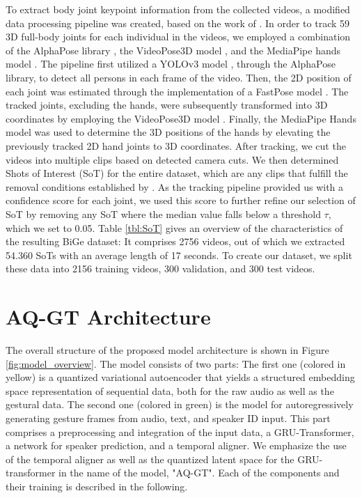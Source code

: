 \documentclass[sigconf]{acmart}
\begin{document}
To extract body joint keypoint information from the collected videos, a modified data processing pipeline was created, based on the work of \citet{yoonRobotsLearnSocial2019a}.
In order to track 59 3D full-body joints for each individual in the videos, we employed a combination of the AlphaPose library \cite{alphapose}, the VideoPose3D model \cite{pavllo20193d}, and the MediaPipe hands model \cite{zhang2020mediapipe}.
The pipeline first utilized a YOLOv3 model \cite{redmon2018yolov3}, through the AlphaPose library, to detect all persons in each frame of the video. Then, the 2D position of each joint was estimated through the implementation of a FastPose model \cite{zhang2019fast}. The tracked joints, excluding the hands, were subsequently transformed into 3D coordinates by employing the VideoPose3D model \cite{pavllo20193d}. Finally, the MediaPipe Hands model was used to determine the 3D positions of the hands by elevating the previously tracked 2D hand joints to 3D coordinates. 
After tracking, we cut the videos into multiple clips based on detected camera cuts. We then determined Shots of Interest (SoT) for the entire dataset, which are any clips that fulfill the removal conditions established by \citet{yoonRobotsLearnSocial2019a}. As the tracking pipeline provided us with a confidence score for each joint, we used this score to further refine our selection of SoT by removing any SoT where the median value falls below a threshold $\tau$, which we set to 0.05. Table \ref{tbl:SoT} gives an overview of the characteristics of the resulting BiGe dataset: It comprises 2756 videos, out of which we extracted 54.360 SoTs with an average length of 17 seconds. To create our dataset, we split these data into 2156 training videos, 300 validation, and 300 test videos.


\section{AQ-GT Architecture}
The overall structure of the proposed model architecture is shown in Figure \ref{fig:model_overview}. The model consists of two parts: The first one (colored in yellow) is a quantized variational autoencoder that yields a structured embedding space representation of sequential data, both for the raw audio as well as the gestural data. The second one (colored in green) is the model for autoregressively generating gesture frames from audio, text, and speaker ID input. This part comprises a preprocessing and integration of the input data, a GRU-Transformer, a network for speaker prediction, and a temporal aligner. We emphasize the use of the temporal aligner as well as the quantized latent space for the GRU-transformer in the name of the model, "AQ-GT". Each of the components and their training is described in the following.
\end{document}

